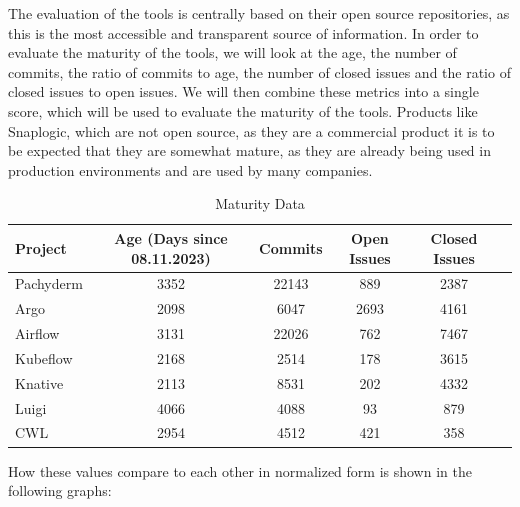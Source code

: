 

The evaluation of the tools is centrally based on their open source repositories, as this is the most accessible and transparent source of information.
In order to evaluate the maturity of the tools, we will look at the age, the number of commits, the ratio of commits to age, the number of closed issues and the ratio of closed issues to open issues.
We will then combine these metrics into a single score, which will be used to evaluate the maturity of the tools. Products like Snaplogic, which are not open source,
as they are a commercial product it is to be expected that they are somewhat mature, as they are already being used in production environments and are used by many companies.


\begin{table}[htb]
  \centering
  \label{tab:maturity_data}
  \begin{tabular}{|l|c|c|c|c|c|}
    \hline
    \textbf{Project} & \textbf{Age (Days since 08.11.2023)} & \textbf{Commits} &  \textbf{ Open Issues} & \textbf{Closed Issues} \\
    \hline
    Pachyderm  & 3352 & 22143 & 889 & 2387  \\
    Argo      & 2098 & 6047  & 2693 & 4161 \\
    Airflow    & 3131 & 22026 & 762 & 7467 \\
    Kubeflow   & 2168 & 2514  & 178 & 3615 \\
    Knative    & 2113 & 8531  & 202 & 4332 \\
    Luigi      & 4066 & 4088  & 93  & 879  \\
    CWL        & 2954 & 4512  & 421 & 358  \\
    \hline
 \end{tabular}
 \caption[Maturity Data]{Maturity Data\footnotemark}
\end{table}


How these values compare to each other in normalized form is shown in the following graphs:

